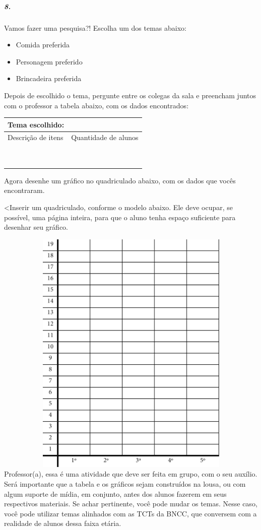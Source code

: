 \subparagraph{8. }\label{section-85}

Vamos fazer uma pesquisa?! Escolha um dos temas abaixo:

\begin{itemize}
\item
  Comida preferida
\item
  Personagem preferido
\item
  Brincadeira preferida
\end{itemize}

Depois de escolhido o tema, pergunte entre os colegas da sala e
preencham juntos com o professor a tabela abaixo, com os dados
encontrados:

\begin{longtable}[]{@{}ll@{}}
\toprule
Tema escolhido:\tabularnewline
\midrule
\endhead
Descrição de itens & Quantidade de alunos\tabularnewline
&\tabularnewline
&\tabularnewline
&\tabularnewline
&\tabularnewline
&\tabularnewline
&\tabularnewline
&\tabularnewline
&\tabularnewline
&\tabularnewline
\bottomrule
\end{longtable}

Agora desenhe um gráfico no quadriculado abaixo, com os dados que vocês
encontraram.

\textless{}Inserir um quadriculado, conforme o modelo abaixo. Ele deve
ocupar, se possível, uma página inteira, para que o aluno tenha espaço
suficiente para desenhar seu gráfico.

\includegraphics[width=6.27778in,height=4.70833in]{media/image96.png}
Professor(a), essa é uma atividade que deve ser feita em grupo, com o
seu auxílio. Será importante que a tabela e os gráficos sejam
construídos na lousa, ou com algum suporte de mídia, em conjunto, antes
dos alunos fazerem em seus respectivos materiais. Se achar pertinente,
você pode mudar os temas. Nesse caso, você pode utilizar temas alinhados
com as TCTs da BNCC, que conversem com a realidade de alunos dessa faixa
etária.

